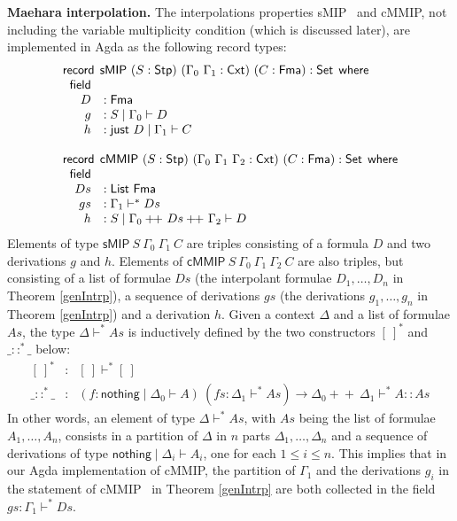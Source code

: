 \documentclass[sn-mathphys-num]{sn-jnl}%
\newcommand{\GG}{\Gamma}
\newcommand{\sMIP}{\textsf{sMIP}}
\newcommand{\cMMIP}{\textsf{cMMIP}}
\newcommand{\List}{\mathsf{List}}
\newcommand{\nothing}{\mathsf{nothing}}
\newcommand{\just}{\mathsf{just}}
\newcommand{\append}{+\!\!+}
\newcommand{\Fma}{\mathsf{Fma}}
\newcommand{\where}{\mathsf{where}}
\newcommand{\Set}{\mathsf{Set}}
\newcommand{\record}{\mathsf{record}}
\newcommand{\field}{\mathsf{field}}
\newcommand{\Stp}{\mathsf{Stp}}
\newcommand{\Cxt}{\mathsf{Cxt}}
\theoremstyle{thmstyleone}%
\theoremstyle{thmstyletwo}%
\theoremstyle{thmstylethree}%
\begin{document}
\noindent\textbf{Maehara interpolation.}
The interpolations properties \sMIP~ and \cMMIP, not including the variable multiplicity condition (which is discussed later), are implemented in Agda as the following record types:
\[
\begin{array}{rl}
  \multicolumn{2}{l}{\record \:\:  \sMIP ~(S : \Stp) ~(\GG_0 ~\GG_1 : \Cxt) ~(C : \Fma) : \Set \:\: \where} \\
  \;\; \field \\
  \;\; D &: \Fma \\
  \;\; g &: S \mid \GG_0 \vdash D \\
  \;\; h &: \just ~D \mid \GG_1 \vdash C \\ \\
  \multicolumn{2}{l}{\record \:\:  \cMMIP ~(S : \Stp) ~(\GG_0 ~\GG_1 ~ \GG_2: \Cxt) ~(C : \Fma) : \Set \:\: \where} \\
  \;\; \field \\
  \;\; Ds &: \List ~\Fma \\
  \;\; gs &: \GG_1 \vdash^* Ds \\
  \;\; h &: S \mid \GG_0 \append ~Ds \append ~\GG_2 \vdash D
\end{array}
\]
Elements of type $\sMIP ~S ~\GG_0 ~\GG_1 ~C$ are triples consisting of a formula $D$ and two derivations $g$ and $h$.
Elements of $\cMMIP ~S ~\GG_0 ~\GG_1 ~\GG_2 ~C$ are also triples, but consisting of a list of formulae $Ds$ (the interpolant formulae $D_1,\dots,D_n$ in Theorem \ref{genIntrp}), a sequence of derivations $gs$ (the derivations $g_1,\dots,g_n$ in Theorem \ref{genIntrp}) and a derivation $h$.
Given a context $\Delta$ and a list of formulae $As$, the type $\Delta \vdash^* As$ is inductively defined by the two constructors $[~]^*$ and $\_ ::^*\!\!\!\_$ below:
\[
\begin{array}{rcl}
  [~]^* &:& [~] \vdash^* [~]\\
  \_ ::^*\!\!\!\_ &:&
  (f : \nothing \mid \Delta_0 \vdash A)
  ~ (fs : \Delta_1 \vdash^* As)
  \to \Delta_0 \append ~\Delta_1 \vdash^* A :: As
\end{array}
\]
In other words, an element of type $\Delta \vdash^* As$, with $As$ being the list of formulae $A_1,\dots,A_n$, consists in a partition of $\Delta$ in $n$ parts $\Delta_1,\dots,\Delta_n$ and a sequence of derivations of type $\nothing \mid \Delta_i \vdash A_i$, one for each $1 \le i \le n$.
This implies that in our Agda implementation of \cMMIP, the partition of $\GG_1$ and the derivations $g_i$ in the statement of \cMMIP~ in Theorem \ref{genIntrp} are both collected in the field $gs : \GG_1 \vdash^* Ds$.
\end{document}
